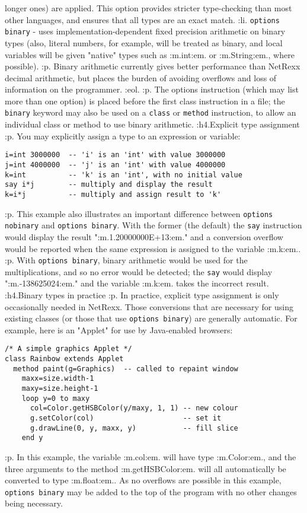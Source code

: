 longer ones) are applied.  This option provides stricter type-checking
than most other languages, and ensures that all types are an exact match.
:li.
\texttt{options binary} - uses implementation-dependent fixed
precision arithmetic on binary types (also, literal numbers, for
example, will be treated as binary, and local variables will be given
"native" types such as :m.int:em. or :m.String:em., where
possible).
:p.
Binary arithmetic currently gives better performance than NetRexx
decimal arithmetic, but places the burden of avoiding overflows and
loss of information on the programmer.
:eol.
:p.
The options instruction (which may list more than one option) is placed
before the first class instruction in a file; the \texttt{binary}
keyword may also be used on a \texttt{class} or \texttt{method}
instruction, to allow an individual class or method to use binary
arithmetic.
:h4.Explicit type assignment
:p.
You may explicitly assign a type to an expression or variable:
\begin{verbatim}
i=int 3000000  -- 'i' is an 'int' with value 3000000
j=int 4000000  -- 'j' is an 'int' with value 4000000
k=int          -- 'k' is an 'int', with no initial value
say i*j        -- multiply and display the result
k=i*j          -- multiply and assign result to 'k'
\end{verbatim}
:p.
This example also illustrates an important difference between
\texttt{options nobinary} and \texttt{options binary}.  With the former
(the default) the \texttt{say} instruction would display the result
":m.1.20000000E+13:em." and a conversion overflow would be
reported when the same expression is assigned to the variable :m.k:em..
:p.
With \texttt{options binary}, binary arithmetic would be used for the
multiplications, and so no error would be detected; the \texttt{say}
would display ":m.-138625024:em." and the variable :m.k:em.
takes the incorrect result.
:h4.Binary types in practice
:p.
In practice, explicit type assignment is only occasionally needed in
NetRexx.  Those conversions that are necessary for using existing
classes (or those that use \texttt{options binary}) are generally
automatic.
For example, here is an "Applet" for use by Java-enabled
browsers:
\begin{verbatim}
/* A simple graphics Applet */
class Rainbow extends Applet
  method paint(g=Graphics)  -- called to repaint window
    maxx=size.width-1
    maxy=size.height-1
    loop y=0 to maxy
      col=Color.getHSBColor(y/maxy, 1, 1) -- new colour
      g.setColor(col)                     -- set it
      g.drawLine(0, y, maxx, y)           -- fill slice
    end y
\end{verbatim}
:p.
In this example, the variable :m.col:em. will have
type :m.Color:em., and the three arguments to the
method :m.getHSBColor:em. will all automatically be converted to
type :m.float:em..  As no overflows are possible in this example,
\texttt{options binary} may be added to the top of the program with no
other changes being necessary.
